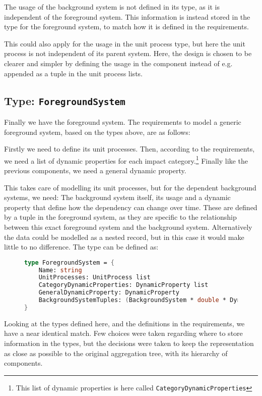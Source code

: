 The usage of the background system is not defined in its type, as it is independent of the foreground system. This information is instead stored in the type for the foreground system, to match how it is defined in the requirements.

This could also apply for the usage in the unit process type, but here the unit process is not independent of its parent system. Here, the design is chosen to be clearer and simpler by defining the usage in the component instead of e.g. appended as a tuple in the unit process lists.

\subsection{Type: \texttt{ForegroundSystem}}
Finally we have the foreground system. The requirements to model a generic foreground system, based on the types above, are as follows: 

Firstly we need to define its unit processes. Then, according to the requirements, we need a list of dynamic properties for each impact category.\footnote{This list of dynamic properties is here called \texttt{CategoryDynamicProperties}} Finally like the previous components, we need a general dynamic property. 

This takes care of modelling its unit processes, but for the dependent background systems, we need: The background system itself, its usage and a dynamic property that define how the dependency can change over time. These are defined by a tuple in the foreground system, as they are specific to the relationship between this exact foreground system and the background system. Alternatively the data could be modelled as a nested record, but in this case it would make little to no difference. The type can be defined as:

\begin{figure}[H]
\begin{lstlisting}[language=FSharp]
type ForegroundSystem = {
    Name: string
    UnitProcesses: UnitProcess list
    CategoryDynamicProperties: DynamicProperty list
    GeneralDynamicProperty: DynamicProperty
    BackgroundSystemTuples: (BackgroundSystem * double * DynamicProperty) list
}
\end{lstlisting}
\end{figure}

\vspace{1 cm}
Looking at the types defined here, and the definitions in the requirements, we have a near identical match. Few choices were taken regarding where to store information in the types, but the decisions were taken to keep the representation as close as possible to the original aggregation tree, with its hierarchy of components.

